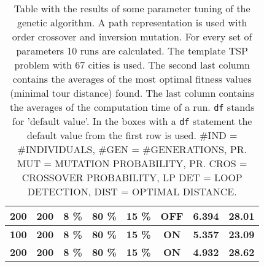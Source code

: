 \begin{table}[!]
\begin{tabular}{|c|c|c|c|c|c|c|c|}
\textbf{200}         & \textbf{200}         & \textbf{8 \%}          & \textbf{80 \%}          & \textbf{15 \%}       & \textbf{OFF}          & \textbf{6.394}        & \textbf{28.01}                \\ \hline
\textbf{100}         & \textbf{200}         & \textbf{8 \%}          & \textbf{80 \%}          & \textbf{15 \%}       & \textbf{ON}           & \textbf{5.357}        & \textbf{23.09}                \\ \hline
\textbf{200}         & \textbf{200}         & \textbf{8 \%}          & \textbf{80 \%}          & \textbf{15 \%}       & \textbf{ON}           & \textbf{4.932}        & \textbf{28.62}                \\ \hline
\end{tabular}
\caption{Table with the results of some parameter tuning of the genetic algorithm. A path representation is used with order crossover and inversion mutation. For every set of parameters 10 runs are calculated. The template TSP problem with $67$ cities is used. The second last column contains the averages of the most optimal fitness values (minimal tour distance) found. The last column contains the averages of the computation time of a run. \texttt{df} stands for 'default value'. In the boxes with a \texttt{df} statement the default value from the first row is used. \#IND = \#INDIVIDUALS, \#GEN = \#GENERATIONS, PR. MUT = MUTATION PROBABILITY, PR. CROS = CROSSOVER PROBABILITY, LP DET = LOOP DETECTION, DIST = OPTIMAL DISTANCE. }
\label{table:question_3}
\end{table}

\FloatBarrier